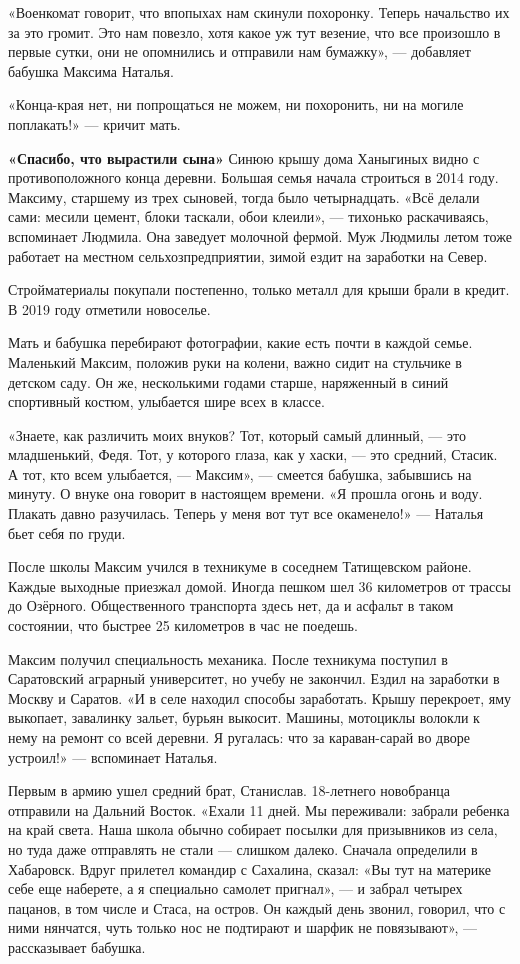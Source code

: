 «Военкомат говорит, что впопыхах нам скинули похоронку. Теперь начальство их за это громит. Это нам повезло, хотя какое уж тут везение, что все произошло в первые сутки, они не опомнились и отправили нам бумажку», --- добавляет бабушка Максима Наталья.

«Конца-края нет, ни попрощаться не можем, ни похоронить, ни на могиле поплакать!» --- кричит мать.

\textbf{«Спасибо, что вырастили сына»} Синюю крышу дома Ханыгиных видно с противоположного конца деревни. Большая семья начала строиться в 2014 году. Максиму, старшему из трех сыновей, тогда было четырнадцать. «Всё делали сами: месили цемент, блоки таскали, обои клеили», --- тихонько раскачиваясь, вспоминает Людмила. Она заведует молочной фермой. Муж Людмилы летом тоже работает на местном сельхозпредприятии, зимой ездит на заработки на Север.

Стройматериалы покупали постепенно, только металл для крыши брали в кредит. В 2019 году отметили новоселье.

Мать и бабушка перебирают фотографии, какие есть почти в каждой семье. Маленький Максим, положив руки на колени, важно сидит на стульчике в детском саду. Он же, несколькими годами старше, наряженный в синий спортивный костюм, улыбается шире всех в классе.

«Знаете, как различить моих внуков? Тот, который самый длинный, --- это младшенький, Федя. Тот, у которого глаза, как у хаски, --- это средний, Стасик. А тот, кто всем улыбается, --- Максим», --- смеется бабушка, забывшись на минуту. О внуке она говорит в настоящем времени. «Я прошла огонь и воду. Плакать давно разучилась. Теперь у меня вот тут все окаменело!» --- Наталья бьет себя по груди.

После школы Максим учился в техникуме в соседнем Татищевском районе. Каждые выходные приезжал домой. Иногда пешком шел 36 километров от трассы до Озёрного. Общественного транспорта здесь нет, да и асфальт в таком состоянии, что быстрее 25 километров в час не поедешь.

Максим получил специальность механика. После техникума поступил в Саратовский аграрный университет, но учебу не закончил. Ездил на заработки в Москву и Саратов. «И в селе находил способы заработать. Крышу перекроет, яму выкопает, завалинку зальет, бурьян выкосит. Машины, мотоциклы волокли к нему на ремонт со всей деревни. Я ругалась: что за караван-сарай во дворе устроил!» --- вспоминает Наталья.

Первым в армию ушел средний брат, Станислав. 18-летнего новобранца отправили на Дальний Восток. «Ехали 11 дней. Мы переживали: забрали ребенка на край света. Наша школа обычно собирает посылки для призывников из села, но туда даже отправлять не стали --- слишком далеко. Сначала определили в Хабаровск. Вдруг прилетел командир с Сахалина, сказал: «Вы тут на материке себе еще наберете, а я специально самолет пригнал», --- и забрал четырех пацанов, в том числе и Стаса, на остров. Он каждый день звонил, говорил, что с ними нянчатся, чуть только нос не подтирают и шарфик не повязывают», --- рассказывает бабушка.

